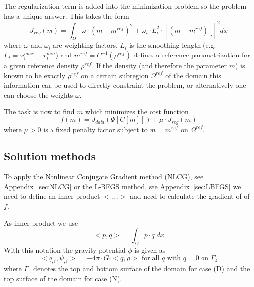 The regularization term is added into the minimization problem so the problem has a unique answer. This
takes the form 
\begin{equation}\label{GRAV:EQU:104}
J_{reg}(m) =  \int_{\Omega} \omega \cdot (m-m^{ref})^2 + \omega_i \cdot L_i^2 \cdot [ (m -m^{ref})_{,i}] ^2 dx
\end{equation} 
where $\omega$ and $\omega_i$ are weighting factors, $L_i$ is the smoothing length (e.g. $L_i= x^{max}_i-x^{min}_i$)
and $m^{ref}=C^{-1}(\rho^{ref})$ defines a reference parametrization for a given reference 
density $\rho^{ref}$. 
If the density (and therefore the parameter $m$) is known to be exactly $\rho^{ref}$ on a certain subregion $\Omega^{ref}$ of
the domain this information can be used
to directly constraint the problem, or alternatively one can choose the weights $\omega$. 

The task is now to find $m$ which minimizes the cost function
\begin{equation}\label{GRAV:EQU:103}
f(m) =  J_{data}(\Psi[C[m]]) +  \mu \cdot J_{reg}(m)
\end{equation} 
where $\mu>0$ is a fixed penalty factor subject to $m=m^{ref}$ on $\Omega^{ref}$.

\subsection{Solution methods}
To apply the Nonlinear Conjugate Gradient method (NLCG), see Appendix~\ref{sec:NLCG} or the L-BFGS method, see Appendix~\ref{sec:LBFGS} we need
to define an inner product $<.,.>$ and need to calculate the gradient of of $f$. 

As inner product we use 
\begin{equation}\label{GRAV:EQU:200}
<p,q> = \int_{\Omega} p \cdot q \; dx
\end{equation} 
With this notation the gravity potential $\phi$ is given as
\begin{equation}\label{GRAV:EQU:201}
< q_{,i},\psi_{,i} > = - 4\pi \cdot G \cdot  < q , \rho > \mbox{ for all } q \mbox{ with } q=0 \mbox{ on } \Gamma_{z}
\end{equation} 
where $\Gamma_{z}$ denotes the top and bottom surface of the domain for case (D)
and the top surface of the domain for case (N). 


